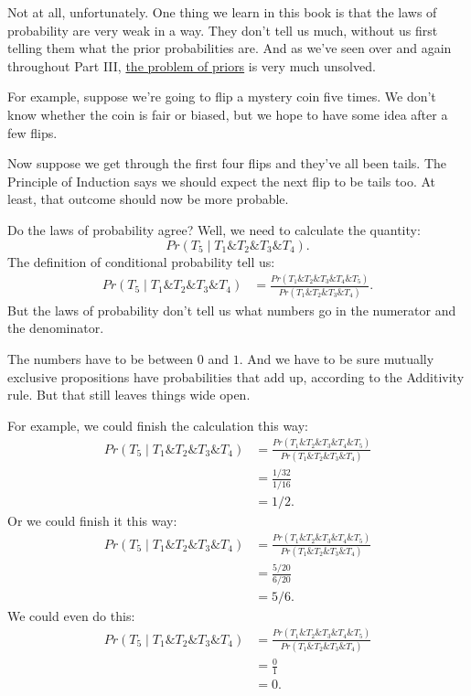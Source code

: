 \documentclass[justified]{tufte-book}
\newcommand{\given}{\mid}
\renewcommand{\wedge}{\mathbin{\&}}
\newcommand{\p}{Pr}
\theoremstyle{definition}
\theoremstyle{definition}
\theoremstyle{definition}
\theoremstyle{remark}
\begin{document}
Not at all, unfortunately. One thing we learn in this book is that the laws of probability are very weak in a way. They don't tell us much, without us first telling them what the prior probabilities are. And as we've seen over and again throughout Part III, \protect\hyperlink{priors}{the problem of priors} is very much unsolved.

For example, suppose we're going to flip a mystery coin five times. We don't know whether the coin is fair or biased, but we hope to have some idea after a few flips.

Now suppose we get through the first four flips and they've all been tails. The Principle of Induction says we should expect the next flip to be tails too. At least, that outcome should now be more probable.

Do the laws of probability agree? Well, we need to calculate the quantity:
\[ \p(T_5 \given T_1 \wedge T_2 \wedge T_3 \wedge T_4).\]
The definition of conditional probability tell us:
\[
  \begin{aligned}
    \p(T_5 \given T_1 \wedge T_2 \wedge T_3 \wedge T_4) 
      &= \frac{\p(T_1 \wedge T_2 \wedge T_3 \wedge T_4 \wedge T_5)}
              {\p(T_1 \wedge T_2 \wedge T_3 \wedge T_4)}.
  \end{aligned}
\]
But the laws of probability don't tell us what numbers go in the numerator and the denominator.

The numbers have to be between \(0\) and \(1\). And we have to be sure mutually exclusive propositions have probabilities that add up, according to the Additivity rule. But that still leaves things wide open.

For example, we could finish the calculation this way:
\[
  \begin{aligned}
    \p(T_5 \given T_1 \wedge T_2 \wedge T_3 \wedge T_4) 
      &= \frac{\p(T_1 \wedge T_2 \wedge T_3 \wedge T_4 \wedge T_5)}
              {\p(T_1 \wedge T_2 \wedge T_3 \wedge T_4)}\\
      &= \frac{1/32}{1/16}\\
      &= 1/2.
  \end{aligned}
\]
Or we could finish it this way:
\[
  \begin{aligned}
    \p(T_5 \given T_1 \wedge T_2 \wedge T_3 \wedge T_4) 
      &= \frac{\p(T_1 \wedge T_2 \wedge T_3 \wedge T_4 \wedge T_5)}
              {\p(T_1 \wedge T_2 \wedge T_3 \wedge T_4)}\\
      &= \frac{5/20}{6/20}\\
      &= 5/6.
  \end{aligned}
\]
We could even do this:
\[
  \begin{aligned}
    \p(T_5 \given T_1 \wedge T_2 \wedge T_3 \wedge T_4) 
      &= \frac{\p(T_1 \wedge T_2 \wedge T_3 \wedge T_4 \wedge T_5)}
              {\p(T_1 \wedge T_2 \wedge T_3 \wedge T_4)}\\
      &= \frac{0}{1}\\
      &= 0.
  \end{aligned}
\]
\end{document}
